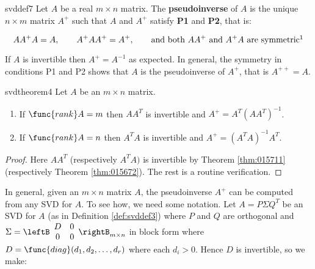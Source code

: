 \begin{definition}{}{svddef7} 
Let $A$ be a real $m\times n$ matrix. The \textbf{pseudoinverse} of $A$ is the unique $n\times m$ matrix $A^{+}$ such that $A$ and $A^{+}$ satisfy \textbf{P1} and \textbf{P2}, that is:

\begin{equation*}
AA^{+}A=A,\qquad A^{+}AA^{+}=A^{+},\qquad \mbox{and both } AA^{+} \mbox{ and } A^{+}A \mbox{ are symmetric}\footnotemark
\end{equation*}
\end{definition}

If $A$ is invertible then $A^{+}=A^{-1}$ as expected. In general, the
symmetry in conditions P1 and P2 shows that $A$ is the pseudoinverse of $A^{+}$, that is $A^{++}=A$. 

\newpage 
\begin{theorem}{}{svdtheorem4} 
Let $A$ be an $m\times n$ matrix.

\begin{enumerate}
\item If $\func{rank}A=m$ then $AA^{T}$ is invertible and $A^{+}=A^{T}(AA^{T})^{-1}$.

\item If $\func{rank}A=n$ then $A^{T}A$ is invertible and $A^{+}=(A^{T}A)^{-1}A^{T}$.
\end{enumerate}
\end{theorem}

\begin{proof}
Here $AA^{T}$ (respectively $A^{T}A)$ is
invertible by Theorem \ref{thm:015711} (respectively Theorem \ref{thm:015672}). The rest is a
routine verification.
\end{proof}

In general, given an $m\times n$ matrix $A$, the pseudoinverse $A^{+}$ can
be computed from any SVD for $A$. To see how, we need some notation. Let $A=P\Sigma Q^{T}$ be an SVD for $A$ (as in Definition \ref{def:svddef3}) where $P$ and $Q$ are orthogonal and $\Sigma =
\leftB 
\begin{array}{cc}
D & 0 \\ 
0 & 0
\end{array}
\rightB_{m\times n}$ in block form where $D=\func{diag}(d_{1},d_{2},\ldots ,d_{r})$ where each $d_{i}>0$. Hence $D$ is
invertible, so we make:

